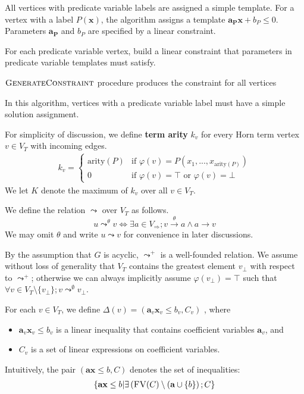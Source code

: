 \documentclass[a4paper,12pt]{article}
\newcommand{\edge}[2]{#1\rightarrow#2}
\newcommand{\edgel}[3]{#1\xrightarrow{#2}#3}
\begin{document}
All vertices with predicate variable labels are assigned a simple
template.  For a vertex with a label $P(\mathbf{x})$, the algorithm
assigns a template $\mathbf{a_P} \mathbf{x} + b_P \leq 0$.  Parameters
$\mathbf{a_P}$ and $b_P$ are specified by a linear constraint.

For each predicate variable vertex, build a linear constraint
  that parameters in predicate variable templates must satisfy.



$\mbox{\sc GenerateConstraint}$ procedure produces the constraint for all vertices


In this algorithm, vertices with a predicate variable label must have
a simple solution assignment.



For simplicity of discussion, we define \textbf{term arity} $k_v$ for
every Horn term vertex $v \in V_T$ with incoming edges.
\begin{align*}
k_v =
\begin{cases}
\mathrm{arity}(P) & \mbox{if } \varphi(v) = P(x_1,...,x_{\mathrm{arity}(P)}) \\
0 & \mbox{if } \varphi(v) = \top \mbox { or } \varphi(v) = \bot
\end{cases}
\end{align*}
We let $K$ denote the maximum of $k_v$ over all $v \in V_T$.

We define the relation $\leadsto$ over $V_T$ as follows.
\[ u \mathop{\leadsto}^\theta v \Longleftrightarrow
\exists a \in V_\Rightarrow; \edgel{v}{\theta}{a} \wedge \edge{a}{v} \]
We may omit $\theta$ and write $u \leadsto v$ for convenience in later
discussions.

By the assumption that $G$ is acyclic, $\leadsto^+$ is a well-founded
relation. We assume without loss of generality that $V_T$ contains the
greatest element $v_\bot$ with respect to $\leadsto^+$; otherwise we
can always implicitly assume $\varphi(v_\bot) = \top$ such that
$\forall v \in V_T \setminus \{v_\bot\}; v \mathop{\leadsto}^\emptyset v_\bot$.

For each $v \in V_T$, we define
$\Delta(v) = (\mathbf{a}_v \mathbf{x}_v \leq b_v, C_v)$
, where
\begin{itemize}
\item $\mathbf{a}_v \mathbf{x}_v \leq b_v$ is a linear inequality that
  contains coefficient variables $\mathbf{a}_v$, and
\item $C_v$ is a set of linear expressions on coefficient variables.
\end{itemize}
Intuitively, the pair $(\mathbf{a} \mathbf{x} \leq b, C)$ denotes the
set of inequalities:
\begin{align*}
\left\lbrace
 \mathbf{a} \mathbf{x} \leq b \middle|
 \exists \left( \textsc{FV}(C)
  \setminus (\mathbf{a} \cup \left\lbrace b \right\rbrace
 \right); C
\right\rbrace
\end{align*}
\end{document}
